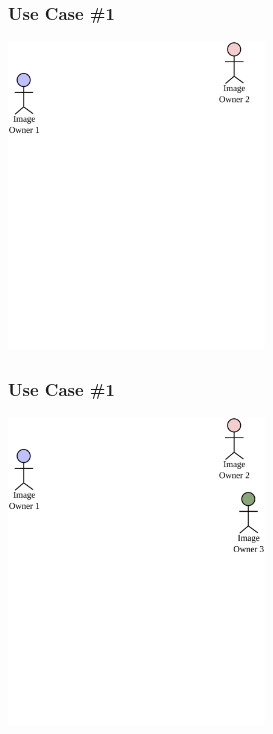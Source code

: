 \documentclass[mathserif,xcolor=dvipsnames,hyperref={bookmarks=true}]{beamer}
\begin{document}
    \begin{frame}[t]
        \frametitle{Use Case \#1}
        \begin{center}
            \includegraphics[width=0.51\textwidth]{../resources/usecases/usecase1/usecase1-step02.pdf}
        \end{center}
    \end{frame}
    \begin{frame}[t]
        \frametitle{Use Case \#1}
        \begin{center}
            \includegraphics[width=0.51\textwidth]{../resources/usecases/usecase1/usecase1-step03.pdf}
        \end{center}
    \end{frame}
\end{document}
